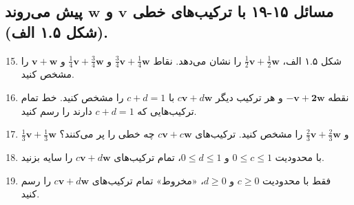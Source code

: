 \documentclass[12pt, a4paper]{book}
\begin{document}
	\subsection*{مسائل ۱۵-۱۹ با ترکیب‌های خطی $\mathbf{v}$ و $\mathbf{w}$ پیش می‌روند (شکل ۱.۵ الف).}
	\begin{enumerate}
		\setcounter{enumi}{14}
		\item شکل ۱.۵ الف، $\frac{1}{2}\mathbf{v} + \frac{1}{2}\mathbf{w}$ را نشان می‌دهد. نقاط $\frac{3}{4}\mathbf{v} + \frac{1}{4}\mathbf{w}$ و $\frac{1}{4}\mathbf{v} + \frac{3}{4}\mathbf{w}$ و $\mathbf{v}+\mathbf{w}$ را مشخص کنید.
		\item نقطه $\mathbf{-v} + \mathbf{2w}$ و هر ترکیب دیگر $c\mathbf{v}+d\mathbf{w}$ با $c+d=1$ را مشخص کنید. خط تمام ترکیب‌هایی که $c+d=1$ دارند را رسم کنید.
		\item $\frac{1}{3}\mathbf{v}+\frac{1}{3}\mathbf{w}$ و $\frac{2}{3}\mathbf{v}+\frac{2}{3}\mathbf{w}$ را مشخص کنید. ترکیب‌های $c\mathbf{v}+c\mathbf{w}$ چه خطی را پر می‌کنند؟
		\item با محدودیت $0 \le c \le 1$ و $0 \le d \le 1$، تمام ترکیب‌های $c\mathbf{v}+d\mathbf{w}$ را سایه بزنید.
		\item فقط با محدودیت $c \ge 0$ و $d \ge 0$، «مخروط» تمام ترکیب‌های $c\mathbf{v}+d\mathbf{w}$ را رسم کنید.
	\end{enumerate}
	
\end{document}
